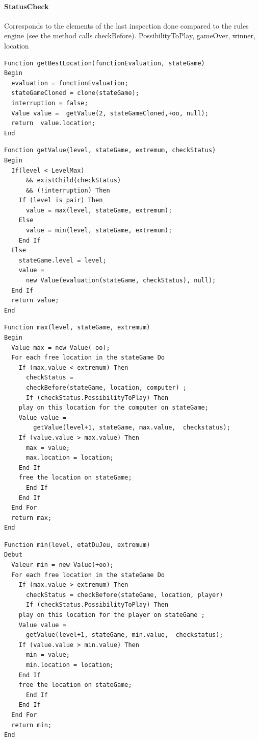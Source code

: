 \documentclass[a4paper,12pt]{report}
\begin{document}
	  \paragraph*{StatusCheck}
	  Corresponds to the elements of the last inspection done compared to the rules engine (see the method calls checkBefore).
	  {PossibilityToPlay, gameOver, winner, location}
	  \begin{center}
	  \begin{verbatim}
Function getBestLocation(functionEvaluation, stateGame)
Begin 
  evaluation = functionEvaluation;
  stateGameCloned = clone(stateGame); 
  interruption = false; 
  Value value =  getValue(2, stateGameCloned,+oo, null); 
  return  value.location;
End 
	  \end{verbatim} 


	  \begin{verbatim}
Fonction getValue(level, stateGame, extremum, checkStatus)
Begin 
  If(level < LevelMax) 
      && existChild(checkStatus) 
      && (!interruption) Then
    If (level is pair) Then
      value = max(level, stateGame, extremum);
    Else
      value = min(level, stateGame, extremum);
    End If
  Else
    stateGame.level = level;
    value = 
      new Value(evaluation(stateGame, checkStatus), null);
  End If
  return value;
End
	  \end{verbatim} 

	  \begin{verbatim}
Function max(level, stateGame, extremum)
Begin
  Value max = new Value(-oo);
  For each free location in the stateGame Do
    If (max.value < extremum) Then
      checkStatus =
	  checkBefore(stateGame, location, computer) ;
      If (checkStatus.PossibilityToPlay) Then
	play on this location for the computer on stateGame;
	Value value = 
	    getValue(level+1, stateGame, max.value,  checkstatus);
	If (value.value > max.value) Then
	  max = value;
	  max.location = location;
	End If
	free the location on stateGame;
      End If
    End If
  End For
  return max;
End
 \end{verbatim}

	  \begin{verbatim}
Function min(level, etatDuJeu, extremum)
Debut
  Valeur min = new Value(+oo);
  For each free location in the stateGame Do
    If (max.value > extremum) Then
      checkStatus = checkBefore(stateGame, location, player)
      If (checkStatus.PossibilityToPlay) Then
	play on this location for the player on stateGame ;
	Value value = 
	  getValue(level+1, stateGame, min.value,  checkstatus);
	If (value.value > min.value) Then
	  min = value;
	  min.location = location;
	End If
	free the location on stateGame;
      End If
    End If
  End For
  return min;
End
 \end{verbatim}
	\end{center}
\end{document}
